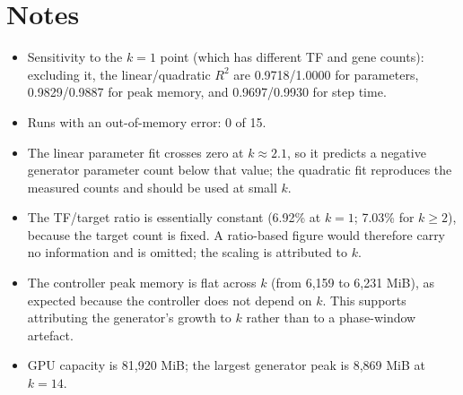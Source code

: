 \documentclass[11pt]{article}
\begin{document}
\section{Notes}
\begin{itemize}
\item Sensitivity to the $k=1$ point (which has different TF and gene counts): excluding it, the linear/quadratic $R^2$ are 0.9718/1.0000 for parameters, 0.9829/0.9887 for peak memory, and 0.9697/0.9930 for step time.
\item Runs with an out-of-memory error: 0 of 15.
\item The linear parameter fit crosses zero at $k\approx2.1$, so it predicts a negative generator parameter count below that value; the quadratic fit reproduces the measured counts and should be used at small $k$.
\item The TF/target ratio is essentially constant (6.92\% at $k=1$; 7.03\% for $k\ge2$), because the target count is fixed. A ratio-based figure would therefore carry no information and is omitted; the scaling is attributed to $k$.
\item The controller peak memory is flat across $k$ (from 6,159 to 6,231 MiB), as expected because the controller does not depend on $k$. This supports attributing the generator's growth to $k$ rather than to a phase-window artefact.
\item GPU capacity is 81,920 MiB; the largest generator peak is 8,869 MiB at $k=14$.
\end{itemize}
\end{document}
